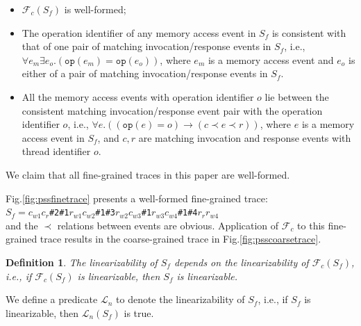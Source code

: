 \documentclass[runningheads]{llncs}
\newcommand{\ecall}{\mathsf{C}}
\newcommand{\eresp}{\mathsf{R}}
\newtheorem{myDef}{Definition}
\begin{document}

\begin{itemize}
  \item $\mathcal{F}_c(S_f)$ is well-formed;
  \item The operation identifier of any memory access event in $S_f$ is consistent with that of one pair of  matching invocation/response events  in $S_f$, i.e.,
      $\forall e_m\exists e_o.(\mathtt{op}(e_m)= \mathtt{op}(e_o))$, where $e_m$ is a memory access event and $e_o$ is either of a pair of matching invocation/response events in $S_f$.
  \item All the memory access events with operation identifier $o$ lie between the consistent matching invocation/response event pair with the operation identifier $o$, i.e.,
      $\forall e.((\mathtt{op}(e)=o)\to(c\prec e\prec r))$, where $e$ is a memory access event in $S_f$, and $c,r$ are matching invocation and response events with thread identifier $o$.
\end{itemize}
\noindent We claim that all fine-grained traces in this paper are well-formed.

%


\begin{example}
Fig.\ref{fig:pssfinetrace} presents a well-formed fine-grained trace:\\
 \quad\quad\quad\quad$S_f = c_{w1}c_r$\texttt{\#2\#1}$r_{w1}c_{w2}$\texttt{\#1\#3}$r_{w2}c_{w3}$\texttt{\#1}$r_{w3}c_{w4}$\texttt{\#1\#4}$r_{r}r_{w4}$\\
and the $\prec$ relations between events are obvious. 
Application of $\mathcal{F}_{c}$ to this fine-grained trace results in the coarse-grained trace in Fig.\ref{fig:psscoarsetrace}.
\end{example}

\begin{myDef}
The linearizability of $S_f$ depends on the linearizability of $\mathcal{F}_c(S_f)$, i.e., if $\mathcal{F}_c(S_f)$ is linearizable, then $S_f$ is linearizable. \end{myDef}

We define a predicate $\mathcal{L}_n$ to denote the linearizability of $S_f$, i.e., if $S_f$ is linearizable, then $\mathcal{L}_n(S_f)$ is true.
\end{document}
